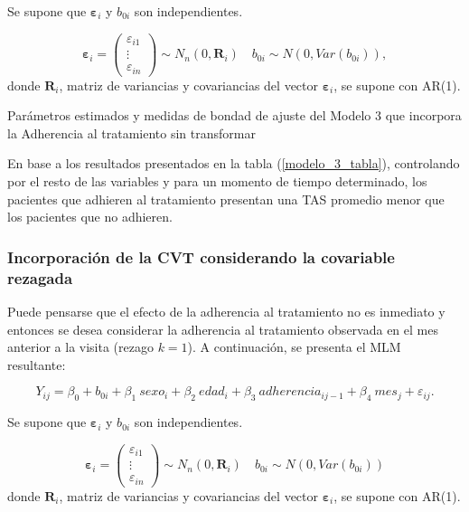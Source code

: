 \documentclass[spanish]{article}
\numberwithin{figure}{subsection}
\numberwithin{equation}{subsection}
\numberwithin{table}{subsection}
\begin{document}
Se supone que $\bm{\varepsilon}_i$ y $b_{0i}$ son independientes.

\[ 
	\bm{\varepsilon}_i = \begin{pmatrix} \varepsilon_{i1} \\ \vdots \\ \varepsilon_{in} \end{pmatrix} \sim N_{n}(0, \bm{R}_i)
	\quad
	b_{0i} \sim N(0, Var(b_{0i})),
\]
donde $\bm{R}_i$, matriz de variancias y covariancias del vector
$\bm{\varepsilon}_{i}$, se supone con AR(1).

\begin{table}[H]
	\centering
	\caption{Parámetros estimados y medidas de bondad de ajuste del Modelo 3 que incorpora la Adherencia al tratamiento sin transformar}
	\label{modelo_3_tabla}
	
\end{table}

En base a los resultados presentados en la tabla (\ref{modelo_3_tabla}),
controlando por el resto de las variables y para un momento de tiempo
determinado, los pacientes que adhieren al tratamiento presentan una TAS
promedio menor que los pacientes que no adhieren.

\subsubsection{Incorporación de la CVT considerando la covariable rezagada}

Puede pensarse que el efecto de la adherencia al tratamiento no es inmediato y
entonces se desea considerar la adherencia al tratamiento observada en el mes
anterior a la visita (rezago $k=1$). A continuación, se presenta el MLM
resultante:

\begin{equation}
	\label{modelo_4}
	Y_{ij} = \beta_0 + b_{0i} + \beta_1\ sexo_i + \beta_2\ edad_i + \beta_3\ adherencia_{ij-1}
	+ \beta_4\ mes_j + \varepsilon_{ij}.
\end{equation}

Se supone que $\bm{\varepsilon}_i$ y $b_{0i}$ son independientes.

\[ 
	\bm{\varepsilon}_i = \begin{pmatrix} \varepsilon_{i1} \\ \vdots \\ \varepsilon_{in} \end{pmatrix} \sim N_{n}(0, \bm{R}_i)
	\quad
	b_{0i} \sim N(0, Var(b_{0i}))
\]
donde $\bm{R}_i$, matriz de variancias y covariancias del vector
$\bm{\varepsilon}_{i}$, se supone con AR(1).
\end{document}
